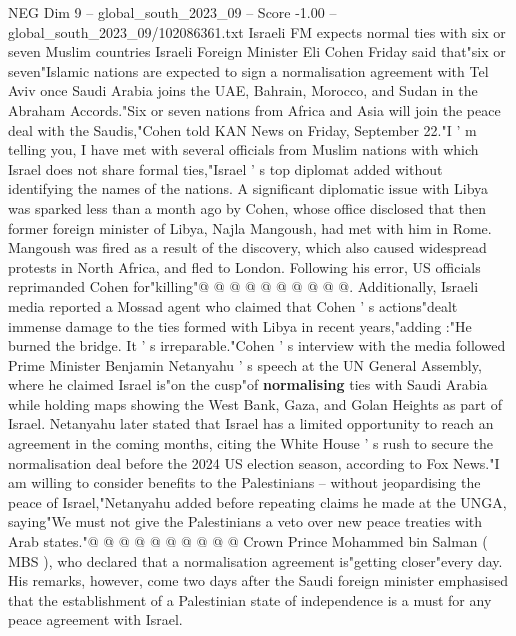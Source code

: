 \begin{textsample}{NEG Dim 9 – global\_south\_2023\_09 – Score -1.00 – global\_south\_2023\_09/102086361.txt}  \label{ex:f9_neg_024}
Israeli FM expects normal ties with six or seven Muslim countries Israeli Foreign Minister Eli Cohen Friday said that"six or seven"Islamic nations are expected to sign a normalisation agreement with Tel Aviv once Saudi Arabia joins the UAE, Bahrain, Morocco, and Sudan in the Abraham Accords."Six or seven nations from Africa and Asia will join the peace deal with the Saudis,"Cohen told KAN News on Friday, September 22."I ' m telling you, I have met with several officials from Muslim nations with which Israel does not share formal ties,"Israel ' s top diplomat added without identifying the names of the nations.
A significant diplomatic issue with Libya was sparked less than a month ago by Cohen, whose office disclosed that then former foreign minister of Libya, Najla Mangoush, had met with him in Rome.
Mangoush was fired as a result of the discovery, which also caused widespread protests in North Africa, and fled to London.
Following his error, US officials reprimanded Cohen for"killing"@ @ @ @ @ @ @ @ @ @.
Additionally, Israeli media reported a Mossad agent who claimed that Cohen ' s actions"dealt immense damage to the ties formed with Libya in recent years,"adding :"He burned the bridge.
It ' s irreparable."Cohen ' s interview with the media followed Prime Minister Benjamin Netanyahu ' s speech at the UN General Assembly, where he claimed Israel is"on the cusp"of \textbf{normalising} ties with Saudi Arabia while holding maps showing the West Bank, Gaza, and Golan Heights as part of Israel.
Netanyahu later stated that Israel has a limited opportunity to reach an agreement in the coming months, citing the White House ' s rush to secure the normalisation deal before the 2024 US election season, according to Fox News."I am willing to consider benefits to the Palestinians -- without jeopardising the peace of Israel,"Netanyahu added before repeating claims he made at the UNGA, saying"We must not give the Palestinians a veto over new peace treaties with Arab states."@ @ @ @ @ @ @ @ @ @ Crown Prince Mohammed bin Salman ( MBS ), who declared that a normalisation agreement is"getting closer"every day.
His remarks, however, come two days after the Saudi foreign minister emphasised that the establishment of a Palestinian state of independence is a must for any peace agreement with Israel.

\end{textsample}
